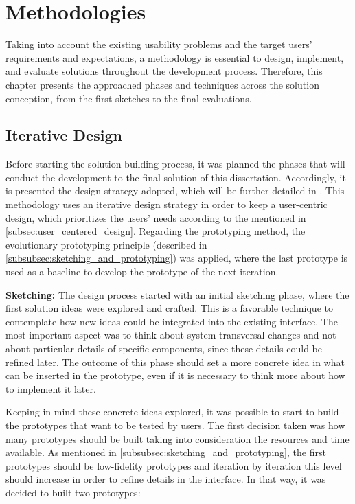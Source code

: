 

\chapter{Methodologies}
\label{cha:methodologies}
Taking into account the existing usability problems and the target users' requirements and expectations, a methodology is essential to design, implement, and evaluate solutions throughout the development process. Therefore, this chapter presents the approached phases and techniques across the solution conception, from the first sketches to the final evaluations. 

\section{Iterative Design}
\label{sec:iterative_design}
Before starting the solution building process, it was planned the phases that will conduct the development to the final solution of this dissertation. Accordingly, it is presented the design strategy adopted, which will be further detailed in . This methodology uses an iterative design strategy in order to keep a user-centric design, which prioritizes the users' needs according to the mentioned in \ref{subsec:user_centered_design}. Regarding the prototyping method, the evolutionary prototyping principle (described in \ref{subsubsec:sketching_and_prototyping}) was applied, where the last prototype is used as a baseline to develop the prototype of the next iteration.

\textbf{Sketching: }The design process started with an initial sketching phase, where the first solution ideas were explored and crafted. This is a favorable technique to contemplate how new ideas could be integrated into the existing interface. The most important aspect was to think about system transversal changes and not about particular details of specific components, since these details could be refined later. The outcome of this phase should set a more concrete idea in what can be inserted in the prototype, even if it is necessary to think more about how to implement it later.

Keeping in mind these concrete ideas explored, it was possible to start to build the prototypes that want to be tested by users. The first decision taken was how many prototypes should be built taking into consideration the resources and time available. As mentioned in \ref{subsubsec:sketching_and_prototyping}, the first prototypes should be low-fidelity prototypes and iteration by iteration this level should increase in order to refine details in the interface. In that way, it was decided to built two prototypes:

